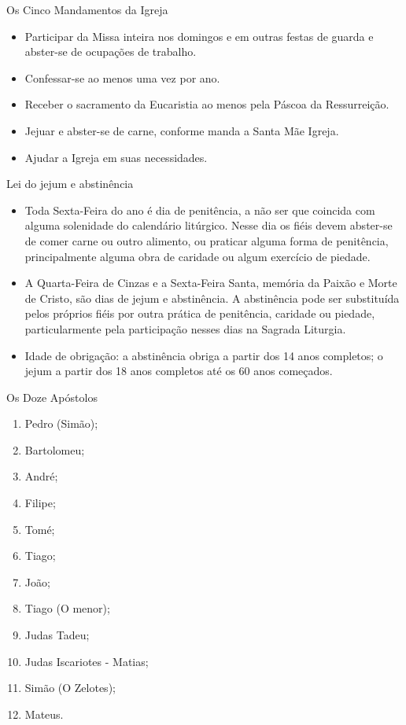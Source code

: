 \documentclass{book}
\begin{document}
\begin{center}
    Os Cinco Mandamentos da Igreja
\end{center}
\begin{itemize}
    \item Participar da Missa inteira nos domingos e em outras festas de guarda e abster-se de ocupações de trabalho.
    \item Confessar-se ao menos uma vez por ano.
    \item Receber o sacramento da Eucaristia ao menos pela Páscoa da Ressurreição.
    \item Jejuar e abster-se de carne, conforme manda a Santa Mãe Igreja.
    \item Ajudar a Igreja em suas necessidades.
\end{itemize}
\begin{center}
    Lei do jejum e abstinência
\end{center}
\begin{itemize}
    \item Toda Sexta-Feira do ano é dia de penitência, a não ser que coincida com alguma solenidade do calendário litúrgico. Nesse dia os fiéis devem abster-se de comer carne ou outro alimento, ou praticar alguma forma de penitência, principalmente alguma obra de caridade ou algum exercício de piedade.
    \item A Quarta-Feira de Cinzas e a Sexta-Feira Santa, memória da Paixão e Morte de Cristo, são dias de jejum e abstinência. A abstinência pode ser substituída pelos próprios fiéis por outra prática de penitência, caridade ou piedade, particularmente pela participação nesses dias na Sagrada Liturgia.
    \item Idade de obrigação: a abstinência obriga a partir dos 14 anos completos; o jejum a partir dos 18 anos completos até os 60 anos começados.
\end{itemize}
\newpage
\begin{center}
    Os Doze Apóstolos
\end{center}
\begin{enumerate}
    \item Pedro (Simão);
    \item Bartolomeu;
    \item André;
    \item Filipe;
    \item Tomé;
    \item Tiago;
    \item João;
    \item Tiago (O menor);
    \item Judas Tadeu;
    \item Judas Iscariotes - Matias;
    \item Simão (O Zelotes);
    \item Mateus.
\end{enumerate}
\end{document}
